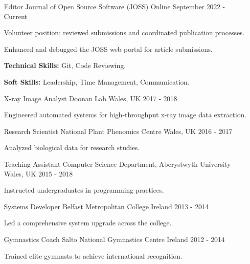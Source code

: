 \begin{cventries}
  \cventry
    {Editor} %
    {Journal of Open Source Software (JOSS)} %
    {Online} %
    {September 2022 - Current} %
    {
      \begin{cvitems}
        \item {Volunteer position; reviewed submissions and coordinated publication processes.}
        \item {Enhanced and debugged the JOSS web portal for article submissions.}
        \item {\textbf{Technical Skills:} Git, Code Reviewing.}
        \item {\textbf{Soft Skills:} Leadership, Time Management, Communication.}
      \end{cvitems}
    }

  \cventry
    {X-ray Image Analyst} %
    {Doonan Lab} %
    {Wales, UK} %
    {2017 - 2018 } %
    {
      \begin{cvitems}
        \item {Engineered automated systems for high-throughput x-ray image data extraction.}
      \end{cvitems}
    }

  \cventry
    {Research Scientist} %
    {National Plant Phenomics Centre} %
    {Wales, UK} %
    {2016 - 2017 } %
    {
      \begin{cvitems}
        \item {Analyzed biological data for research studies.}
      \end{cvitems}
    }

  \cventry
    {Teaching Assistant} %
    {Computer Science Department, Aberystwyth University} %
    {Wales, UK} %
    {2015 - 2018} %
    {
      \begin{cvitems}
        \item {Instructed undergraduates in programming practices.}
      \end{cvitems}
    }

  \cventry
    {Systems Developer} %
    {Belfast Metropolitan College} %
    {Ireland} %
    {2013 - 2014} %
    {
      \begin{cvitems}
        \item {Led a comprehensive system upgrade across the college.}
      \end{cvitems}
    }

  \cventry
    {Gymnastics Coach} %
    {Salto National Gymnastics Centre} %
    {Ireland} %
    {2012 - 2014 } %
    {
      \begin{cvitems}
        \item {Trained elite gymnasts to achieve international recognition.}
      \end{cvitems}
    }

\end{cventries}
